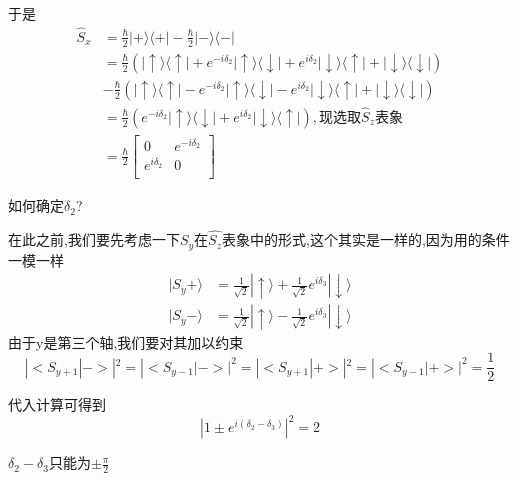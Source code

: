 \documentclass[lang=cn,15pt]{elegantbook}
\begin{document}
 于是
 \begin{equation*}
 	\begin{split}
 		\hat{S}_x&=\frac{\hbar}{2}|+\rangle \langle +|-\frac{\hbar}{2}|-\rangle \langle -|
 		\\
 		&=\frac{\hbar}{2}\left( |\uparrow \rangle \langle \uparrow |+e^{-i\delta _2}|\uparrow \rangle \langle \downarrow |+e^{i\delta _2}|\downarrow \rangle \langle \uparrow |+|\downarrow \rangle \langle \downarrow | \right)\\ &-\frac{\hbar}{2}\left( |\uparrow \rangle \langle \uparrow |-e^{-i\delta _2}|\uparrow \rangle \langle \downarrow |-e^{i\delta _2}|\downarrow \rangle \langle \uparrow |+|\downarrow \rangle \langle \downarrow | \right) 
 		\\
 		&=\frac{\hbar}{2}\left( e^{-i\delta _2}|\uparrow \rangle \langle \downarrow |+e^{i\delta _2}|\downarrow \rangle \langle \uparrow | \right) ,\text{现选取}\hat{S}_z\text{表象}
 		\\
 		&=\frac{\hbar}{2}\left[ \begin{matrix}
 			0&		e^{-i\delta _2}\\
 			e^{i\delta _2}&		0\\
 		\end{matrix} \right] 
 	\end{split}
 \end{equation*}
 
 如何确定$\delta_2$?
 
 在此之前,我们要先考虑一下$\hat{S_y}$在$\hat{S_z}$表象中的形式,这个其实是一样的,因为用的条件一模一样
  \begin{equation*}
 	\begin{split}
 		|S_y+\rangle &=\frac{1}{\sqrt{2}}|\uparrow \rangle +\frac{1}{\sqrt{2}}e^{i\delta _3}|\downarrow \rangle 
 		\\
 		|S_y-\rangle &=\frac{1}{\sqrt{2}}|\uparrow \rangle -\frac{1}{\sqrt{2}}e^{i\delta _3}|\downarrow \rangle 
 	\end{split}
 \end{equation*}
 由于y是第三个轴,我们要对其加以约束
 \begin{equation*}
 	|<S_{y+1}|->|^{2}=|<S_{y-1}|->|^{2}= |<S_{y+1}|+>|^{2}= |<S_{y-1}|+>|^{2}=\frac{1}{2}
 \end{equation*}
 
 代入计算可得到
 \begin{equation*}
 	|1\pm e^{i\left( \delta _2-\delta _3 \right)}|^2=2
 \end{equation*}
 
$ \delta _2-\delta _3$只能为$\pm \frac{\pi}{2}$
\end{document}
